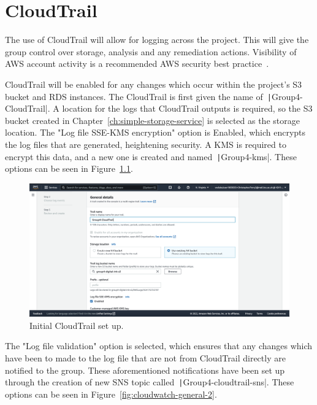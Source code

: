 \chapter{CloudTrail}\label{ch:cloudtrail}

The use of CloudTrail will allow for logging across the project.
This will give the group control over storage, analysis and any remediation actions.
Visibility of AWS account activity is a recommended AWS security best practice~\parencite{amazon2022cloudtrail}.

CloudTrail will be enabled for any changes which occur within the project's S3 bucket and RDS instances.
The CloudTrail is first given the name of~\texttt|Group4-CloudTrail|.
A location for the logs that CloudTrail outputs is required, so the S3 bucket created in
Chapter~\ref{ch:simple-storage-service} is selected as the storage location.
The "Log file SSE-KMS encryption" option is Enabled, which encrypts the log files that are generated, heightening
security.
A KMS is required to encrypt this data, and a new one is created and named~\texttt|Group4-kms|.
These options can be seen in Figure~\ref{fig:cloudwatch-general-1}.

\begin{figure}[!htbp]
    \centering
    \includegraphics[width=\textwidth]{resources/cloudtrail/cloudtrail-general-1}
    \caption{Initial CloudTrail set up.}
    \label{fig:cloudwatch-general-1}
\end{figure}

The "Log file validation" option is selected, which ensures that any changes which have been to made to the log file
that are not from CloudTrail directly are notified to the group.
These aforementioned notifications have been set up through the creation of new SNS topic
called~\texttt|Group4-cloudtrail-sns|.
These options can be seen in Figure~\ref{fig:cloudwatch-general-2}.

